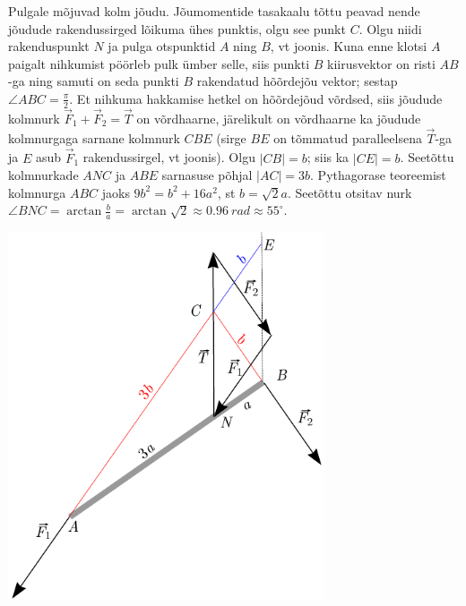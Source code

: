 {\ifSolution
Pulgale mõjuvad kolm jõudu. Jõumomentide tasakaalu tõttu peavad nende jõudude rakendussirged lõikuma ühes punktis, olgu see punkt $C$. Olgu niidi rakenduspunkt $N$ ja pulga otspunktid $A$ ning $B$, vt joonis. Kuna enne klotsi $A$ paigalt nihkumist pöörleb pulk ümber selle, siis punkti $B$ kiirusvektor on risti $AB$-ga ning samuti on seda punkti $B$ rakendatud hõõrdejõu vektor; sestap $\angle ABC=\frac{\pi}{2}$. Et nihkuma hakkamise hetkel on hõõrdejõud võrdsed, siis jõudude kolmnurk $\vec F_1+\vec F_2=\vec T$ on võrdhaarne, järelikult on võrdhaarne ka jõudude kolmnurgaga sarnane kolmnurk $CBE$ (sirge $BE$ on tõmmatud paralleelsena $\vec T$-ga ja $E$ asub $\vec F_1$ rakendussirgel, vt joonis).
Olgu $|CB|=b$; siis ka $|CE|=b$. Seetõttu kolmnurkade $ANC$ ja $ABE$ sarnasuse põhjal $|AC|=3b$. Pythagorase
teoreemist kolmnurga $ABC$ jaoks $9b^2=b^2+16a^2$, st $b=\sqrt 2a$. Seetõttu otsitav nurk $\angle BNC=\arctan \frac ba =\arctan \sqrt 2\approx\SI{0.96}{rad}\approx 55^\circ$.
\begin{center}
\includegraphics[width=0.7\textwidth]{2015-v3g-09-pulk_lah}
\end{center}
\fi


}
